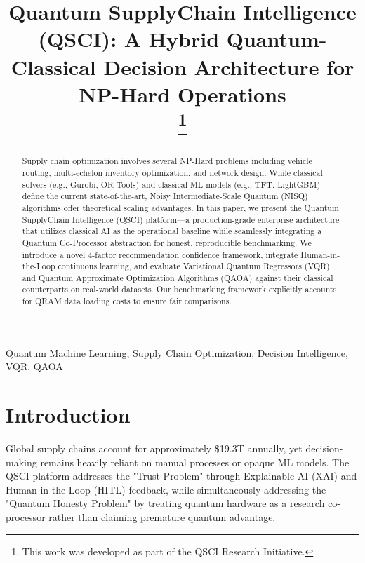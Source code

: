 \documentclass[conference]{IEEEtran}
\begin{document}
\title{Quantum SupplyChain Intelligence (QSCI): A Hybrid Quantum-Classical Decision Architecture for NP-Hard Operations\\
\thanks{This work was developed as part of the QSCI Research Initiative.}
}

\author{
}

\maketitle

\begin{abstract}
Supply chain optimization involves several NP-Hard problems including vehicle routing, multi-echelon inventory optimization, and network design. While classical solvers (e.g., Gurobi, OR-Tools) and classical ML models (e.g., TFT, LightGBM) define the current state-of-the-art, Noisy Intermediate-Scale Quantum (NISQ) algorithms offer theoretical scaling advantages. In this paper, we present the Quantum SupplyChain Intelligence (QSCI) platform—a production-grade enterprise architecture that utilizes classical AI as the operational baseline while seamlessly integrating a Quantum Co-Processor abstraction for honest, reproducible benchmarking. We introduce a novel 4-factor recommendation confidence framework, integrate Human-in-the-Loop continuous learning, and evaluate Variational Quantum Regressors (VQR) and Quantum Approximate Optimization Algorithms (QAOA) against their classical counterparts on real-world datasets. Our benchmarking framework explicitly accounts for QRAM data loading costs to ensure fair comparisons.
\end{abstract}

\begin{IEEEkeywords}
Quantum Machine Learning, Supply Chain Optimization, Decision Intelligence, VQR, QAOA
\end{IEEEkeywords}

\section{Introduction}
Global supply chains account for approximately \$19.3T annually, yet decision-making remains heavily reliant on manual processes or opaque ML models. The QSCI platform addresses the "Trust Problem" through Explainable AI (XAI) and Human-in-the-Loop (HITL) feedback, while simultaneously addressing the "Quantum Honesty Problem" by treating quantum hardware as a research co-processor rather than claiming premature quantum advantage.
\end{document}
